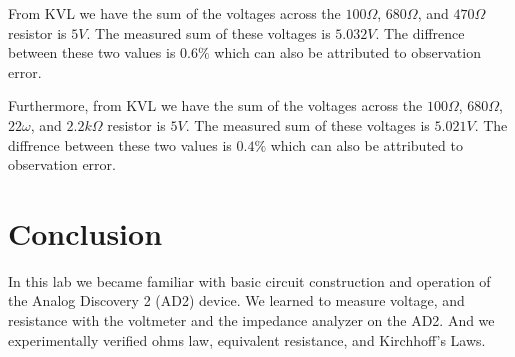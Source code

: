 \documentclass[12pt]{article}
\begin{document}
From KVL we have the sum of the voltages across the  $100\Omega$, $680\Omega$, and $470\Omega$ resistor is $5V$. The measured sum of these voltages is $5.032V$. The diffrence between these two values is $0.6\%$ which can also be attributed to observation error.

Furthermore, from KVL we have the sum of the voltages across the  $100\Omega$, $680\Omega$, $22\omega$, and $2.2k\Omega$ resistor is $5V$. The measured sum of these voltages is $5.021V$. The diffrence between these two values is $0.4\%$ which can also be attributed to observation error.
\pagebreak
\section*{Conclusion}
In this lab we became familiar with basic circuit construction and operation of the Analog  Discovery 2 (AD2) device. We learned to measure voltage, and resistance with the voltmeter and the impedance analyzer on the AD2. And we experimentally verified ohms law, equivalent resistance, and Kirchhoff’s Laws.
\end{document}
